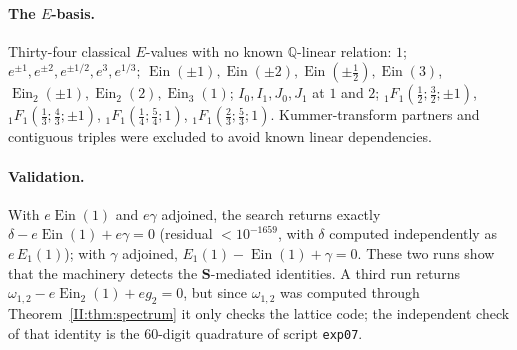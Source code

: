 \documentclass[11pt,a4paper]{article}
\newcommand{\Q}{\mathbb Q}
\newcommand{\Ein}{\operatorname{Ein}}
\newcommand{\Sring}{\mathbf S}
\theoremstyle{definition}
\theoremstyle{remark}
\numberwithin{equation}{section}
\begin{document}
\paragraph{The $E$-basis.} Thirty-four classical $E$-values with no known $\Q$-linear
relation: $1$; $e^{\pm1},e^{\pm2},e^{\pm1/2},e^3,e^{1/3}$; $\Ein(\pm1),\Ein(\pm2),\Ein(\pm\tfrac12),\Ein(3)$,
$\Ein_2(\pm1),\Ein_2(2),\Ein_3(1)$; $I_0,I_1,J_0,J_1$ at $1$ and $2$;
${}_1F_1(\tfrac12;\tfrac32;\pm1)$, ${}_1F_1(\tfrac13;\tfrac43;\pm1)$,
${}_1F_1(\tfrac14;\tfrac54;1)$, ${}_1F_1(\tfrac23;\tfrac53;1)$. Kummer-transform partners
and contiguous triples were excluded to avoid known linear dependencies.

\paragraph{Validation.} With $e\Ein(1)$ and $e\gamma$ adjoined, the search returns exactly
$\delta-e\Ein(1)+e\gamma=0$ (residual $<10^{-1659}$, with $\delta$ computed independently as
$e\,E_1(1)$); with $\gamma$ adjoined, $E_1(1)-\Ein(1)+\gamma=0$. These two runs show that
the machinery detects the $\Sring$-mediated identities. A third run returns
$\omega_{1,2}-e\Ein_2(1)+eg_2=0$, but since $\omega_{1,2}$ was computed through
Theorem~\ref{II:thm:spectrum} it only checks the lattice code; the independent check of that
identity is the $60$-digit quadrature of script \texttt{exp07}.
\end{document}
